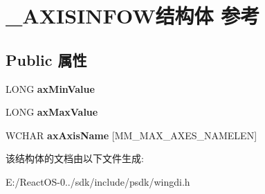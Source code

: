 \hypertarget{struct___a_x_i_s_i_n_f_o_w}{}\section{\+\_\+\+A\+X\+I\+S\+I\+N\+F\+O\+W结构体 参考}
\label{struct___a_x_i_s_i_n_f_o_w}
\subsection*{Public 属性}
\begin{DoxyCompactItemize}
\item 
\mbox{\label{struct___a_x_i_s_i_n_f_o_w_a0826cc7e61923fa63e4bfee9d7c9f98c}} 
L\+O\+NG {\bfseries ax\+Min\+Value}
\item 
\mbox{\label{struct___a_x_i_s_i_n_f_o_w_a465b9e4f3602e78fcbd0d230dfeb3ce0}} 
L\+O\+NG {\bfseries ax\+Max\+Value}
\item 
\mbox{\label{struct___a_x_i_s_i_n_f_o_w_a5a100c1353e308e9cbdcc76905aae8ac}} 
W\+C\+H\+AR {\bfseries ax\+Axis\+Name} \mbox{[}M\+M\+\_\+\+M\+A\+X\+\_\+\+A\+X\+E\+S\+\_\+\+N\+A\+M\+E\+L\+EN\mbox{]}
\end{DoxyCompactItemize}


该结构体的文档由以下文件生成\+:\begin{DoxyCompactItemize}
\item 
E\+:/\+React\+O\+S-\/0../sdk/include/psdk/wingdi.\+h\end{DoxyCompactItemize}
